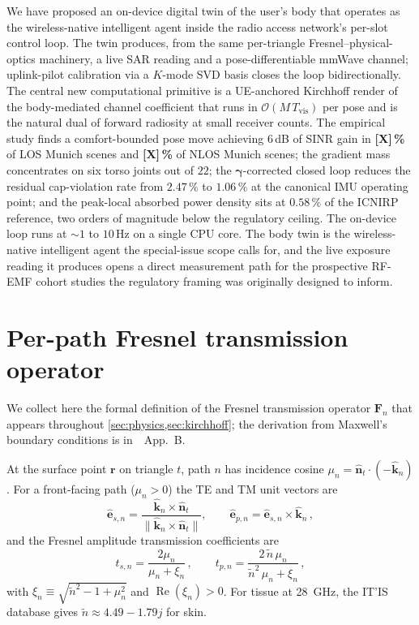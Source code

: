 \documentclass[journal,twocolumn,10pt]{IEEEtran}
\theoremstyle{plain}
\theoremstyle{definition}
\theoremstyle{remark}
\newcommand{\Fn}{\mathbf{F}_n}
\newcommand{\ntilde}{\tilde{n}}
\DeclareMathOperator{\RE}{Re}
\begin{document}
We have proposed an on-device digital twin of the user's body that
operates as the wireless-native intelligent agent inside the radio
access network's per-slot control loop. The twin produces, from the
same per-triangle Fresnel--physical-optics machinery, a live SAR
reading and a pose-differentiable mmWave channel; uplink-pilot
calibration via a $K$-mode SVD basis closes the loop bidirectionally.
The central new computational primitive is a UE-anchored Kirchhoff
render of the body-mediated channel coefficient that runs in
$\mathcal{O}(M\,T_{\mathrm{vis}})$ per pose and is the natural dual
of forward radiosity at small receiver counts. The empirical
study finds a comfort-bounded pose move achieving $6\,$dB of
SINR gain in \textbf{[X]\,\%} of LOS Munich scenes and
\textbf{[X]\,\%} of NLOS Munich scenes;
the gradient mass concentrates on six torso joints out of $22$;
the $\bm{\gamma}$-corrected closed loop reduces the residual
cap-violation rate from $2.47\,\%$ to $1.06\,\%$ at the canonical
IMU operating point; and the peak-local absorbed power density
sits at $0.58\,\%$ of the ICNIRP reference, two orders of
magnitude below the regulatory ceiling. The on-device loop runs
at $\sim\!1$ to $10\,$Hz on a single CPU core. The body twin is
the wireless-native intelligent agent the special-issue scope
calls for, and the live exposure reading it produces opens a
direct measurement path for the prospective RF-EMF cohort
studies the regulatory framing was originally designed to inform.


\appendices
\section{Per-path Fresnel transmission operator}\label{app:fresnel}

We collect here the formal definition of the Fresnel transmission
operator $\Fn$ that appears throughout
\cref{sec:physics,sec:kirchhoff}; the derivation from Maxwell's
boundary conditions is in~\cite{WydaegheMonograph}~App.~B.

At the surface point $\bm{r}$ on triangle $t$, path $n$ has
incidence cosine $\mu_n = \hat{\bm{n}}_t \cdot (-\hat{\bm{k}}_n)$.
For a front-facing path ($\mu_n > 0$) the TE and TM unit vectors are
\begin{equation}\label{eq:TE-TM-basis}
  \hat{\bm{e}}_{s,n} = \frac{\hat{\bm{k}}_n \times \hat{\bm{n}}_t}
                            {\|\hat{\bm{k}}_n \times \hat{\bm{n}}_t\|},
  \qquad
  \hat{\bm{e}}_{p,n} = \hat{\bm{e}}_{s,n} \times \hat{\bm{k}}_n\,,
\end{equation}
and the Fresnel amplitude transmission coefficients are
\begin{equation}\label{eq:fresnel-t}
  t_{s,n} = \frac{2\mu_n}{\mu_n + \xi_n}\,, \qquad
  t_{p,n} = \frac{2\,\ntilde\,\mu_n}{\ntilde^2\,\mu_n + \xi_n}\,,
\end{equation}
with $\xi_n \equiv \sqrt{\ntilde^2 - 1 + \mu_n^2}$ and
$\RE(\xi_n) > 0$. For tissue at 28~GHz, the IT'IS database gives
$\ntilde \approx 4.49 - 1.79j$ for skin.
\end{document}
